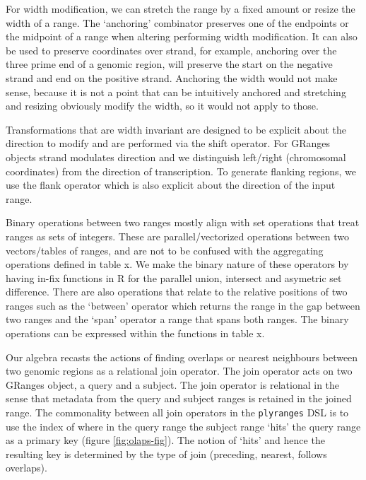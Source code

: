 \documentclass[10pt,letterpaper]{article}
\begin{document}
For width modification, we can stretch the range by a fixed amount or
resize the width of a range. The `anchoring' combinator preserves one of
the endpoints or the midpoint of a range when altering performing width
modification. It can also be used to preserve coordinates over strand,
for example, anchoring over the three prime end of a genomic region,
will preserve the start on the negative strand and end on the positive
strand. Anchoring the width would not make sense, because it is not a
point that can be intuitively anchored and stretching and resizing
obviously modify the width, so it would not apply to those.

Transformations that are width invariant are designed to be explicit
about the direction to modify and are performed via the shift operator.
For GRanges objects strand modulates direction and we distinguish
left/right (chromosomal coordinates) from the direction of
transcription. To generate flanking regions, we use the flank operator
which is also explicit about the direction of the input range.

Binary operations between two ranges mostly align with set operations
that treat ranges as sets of integers. These are parallel/vectorized
operations between two vectors/tables of ranges, and are not to be
confused with the aggregating operations defined in table x. We make the
binary nature of these operators by having in-fix functions in R for the
parallel union, intersect and asymetric set difference. There are also
operations that relate to the relative positions of two ranges such as
the `between' operator which returns the range in the gap between two
ranges and the `span' operator a range that spans both ranges. The
binary operations can be expressed within the functions in table x.

Our algebra recasts the actions of finding overlaps or nearest
neighbours between two genomic regions as a relational join operator.
The join operator acts on two GRanges object, a query and a subject. The
join operator is relational in the sense that metadata from the query
and subject ranges is retained in the joined range. The commonality
between all join operators in the \texttt{plyranges} DSL is to use the
index of where in the query range the subject range `hits' the query
range as a primary key (figure \ref{fig:olaps-fig}). The notion of
`hits' and hence the resulting key is determined by the type of join
(preceding, nearest, follows overlaps).
\end{document}

